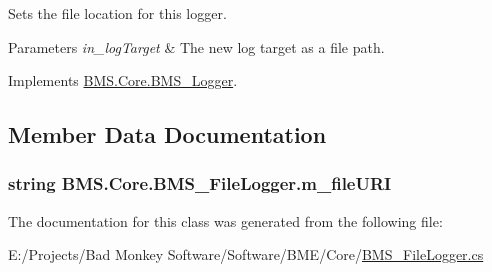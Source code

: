Sets the file location for this logger. 


\begin{DoxyParams}{Parameters}
{\em in\-\_\-log\-Target} & The new log target as a file path.\\
\hline
\end{DoxyParams}


Implements \hyperlink{class_b_m_s_1_1_core_1_1_b_m_s___logger_af494d7578070ae9b6d779c9ecc0392d7}{B\-M\-S.\-Core.\-B\-M\-S\-\_\-\-Logger}.



\subsection{Member Data Documentation}
\hypertarget{class_b_m_s_1_1_core_1_1_b_m_s___file_logger_a76f31e7c9e011c718f8c39f987b9d99b}{
\subsubsection[{m\-\_\-file\-U\-R\-I}]{\setlength{\rightskip}{0pt plus 5cm}string B\-M\-S.\-Core.\-B\-M\-S\-\_\-\-File\-Logger.\-m\-\_\-file\-U\-R\-I\hspace{0.3cm}{\ttfamily [protected]}}}\label{class_b_m_s_1_1_core_1_1_b_m_s___file_logger_a76f31e7c9e011c718f8c39f987b9d99b}


The documentation for this class was generated from the following file\-:\begin{DoxyCompactItemize}
\item 
E\-:/\-Projects/\-Bad Monkey Software/\-Software/\-B\-M\-E/\-Core/\hyperlink{_b_m_s___file_logger_8cs}{B\-M\-S\-\_\-\-File\-Logger.\-cs}\end{DoxyCompactItemize}
